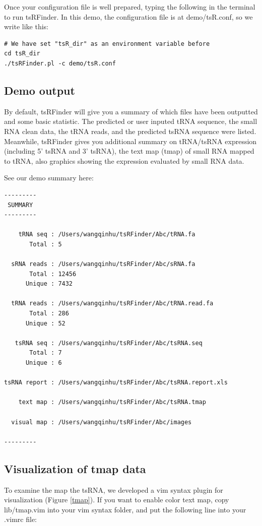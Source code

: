 \documentclass[11pt, a4paper]{article}
\begin{document}
Once your configuration file is well prepared, typing the following in the terminal to run tsRFinder. In this demo, the configuration file is at demo/tsR.conf, so we write like this:

\begin{verbatim}
# We have set "tsR_dir" as an environment variable before
cd tsR_dir
./tsRFinder.pl -c demo/tsR.conf
\end{verbatim}

\subsection{Demo output}

By default, tsRFinder will give you a summary of which files have been outputted and some basic statistic. The predicted or user inputed tRNA sequence, the small RNA clean data, the tRNA reads, and the predicted tsRNA sequence were listed. Meanwhile, tsRFinder gives you additional summary on tRNA/tsRNA expression (including 5' tsRNA and 3' tsRNA), the text map (tmap) of small RNA mapped to tRNA, also graphics showing the expression evaluated by small RNA data.

See our demo summary here:

{\small \begin{verbatim}
---------
 SUMMARY 
---------

    tRNA seq : /Users/wangqinhu/tsRFinder/Abc/tRNA.fa
       Total : 5

  sRNA reads : /Users/wangqinhu/tsRFinder/Abc/sRNA.fa
       Total : 12456
      Unique : 7432

  tRNA reads : /Users/wangqinhu/tsRFinder/Abc/tRNA.read.fa
       Total : 286
      Unique : 52

   tsRNA seq : /Users/wangqinhu/tsRFinder/Abc/tsRNA.seq
       Total : 7
      Unique : 6

tsRNA report : /Users/wangqinhu/tsRFinder/Abc/tsRNA.report.xls

    text map : /Users/wangqinhu/tsRFinder/Abc/tsRNA.tmap

  visual map : /Users/wangqinhu/tsRFinder/Abc/images

---------
\end{verbatim}
}

\subsection{Visualization of tmap data}

To examine the map the tsRNA, we developed a vim syntax plugin for visualization (Figure \ref{tmap}). If you want to enable color text map, copy lib/tmap.vim into your vim syntax folder, and put the following line into your .vimrc file:
\end{document}
